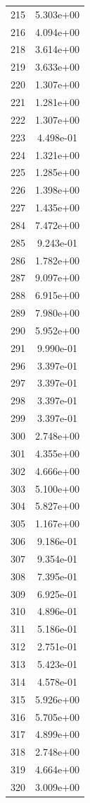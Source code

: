 \documentclass[12pt]{article}
\begin{document}
\begin{longtable}{@{}cc@{}}
215 & 5.303e+00 \\
216 & 4.094e+00 \\
218 & 3.614e+00 \\
219 & 3.633e+00 \\
220 & 1.307e+00 \\
221 & 1.281e+00 \\
222 & 1.307e+00 \\
223 & 4.498e-01 \\
224 & 1.321e+00 \\
225 & 1.285e+00 \\
226 & 1.398e+00 \\
227 & 1.435e+00 \\
284 & 7.472e+00 \\
285 & 9.243e-01 \\
286 & 1.782e+00 \\
287 & 9.097e+00 \\
288 & 6.915e+00 \\
289 & 7.980e+00 \\
290 & 5.952e+00 \\
291 & 9.990e-01 \\
296 & 3.397e-01 \\
297 & 3.397e-01 \\
298 & 3.397e-01 \\
299 & 3.397e-01 \\
300 & 2.748e+00 \\
301 & 4.355e+00 \\
302 & 4.666e+00 \\
303 & 5.100e+00 \\
304 & 5.827e+00 \\
305 & 1.167e+00 \\
306 & 9.186e-01 \\
307 & 9.354e-01 \\
308 & 7.395e-01 \\
309 & 6.925e-01 \\
310 & 4.896e-01 \\
311 & 5.186e-01 \\
312 & 2.751e-01 \\
313 & 5.423e-01 \\
314 & 4.578e-01 \\
315 & 5.926e+00 \\
316 & 5.705e+00 \\
317 & 4.899e+00 \\
318 & 2.748e+00 \\
319 & 4.664e+00 \\
320 & 3.009e+00 \\

\end{longtable}
\end{document}
